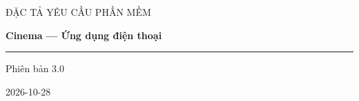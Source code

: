 \documentclass[11pt,a4paper,oneside]{article}
\begin{document}
\begin{titlepage}
\centering
\vspace*{32mm}
{\Large\sffamily\color{SRSlate}ĐẶC TẢ YÊU CẦU PHẦN MỀM\par}
\vspace{14mm}
{\Huge\bfseries\color{SRSlate}Cinema — Ứng dụng điện thoại\par}
\vspace{12mm}
{\color{SRSRule}\rule{.72\textwidth}{.7pt}\par}
\vfill
{\large Phiên bản 3.0\par}
\vspace{4mm}
{\large 2026-10-28\par}
\vspace{20mm}
\end{titlepage}


\clearpage
\tableofcontents
\clearpage
\listoftables
\clearpage
{}




























\end{document}
